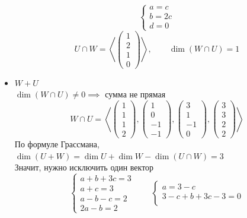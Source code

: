 \begin{itemize}
$$    \begin{cases}
    	a = c \\
        b = 2c \\
        d = 0
    \end{cases} $$
    $$ U \cap W = \left\langle
    \begin{pmatrix}
    	1 \\
        2 \\
        1 \\
        0
    \end{pmatrix} \right\rangle, \qquad \dim (W \cap U) = 1 $$
    \item $ W + U $ \\
    $ \dim (W \cap U) \ne 0 \implies $ сумма не прямая
    $$ W \cap U = \left\langle
    \begin{pmatrix}
    	1 \\
        1 \\
        1 \\
        2
    \end{pmatrix},
    \begin{pmatrix}
    	1 \\
        0 \\
        -1 \\
        -1
    \end{pmatrix},
    \begin{pmatrix}
    	3 \\
        1 \\
        -1 \\
        0
    \end{pmatrix},
    \begin{pmatrix}
    	3 \\
        3 \\
        2 \\
        2
    \end{pmatrix} \right\rangle $$
    По формуле Грассмана, $ \dim (U + W) = \dim U + \dim W - \dim (U \cap W) = 3 $ \\
    Значит, нужно исключить один вектор
    $$
    \begin{cases}
    	a + b + 3c = 3 \\
        a + c = 3 \\
        a - b - c = 2 \\
        2a - b = 2
    \end{cases} \qquad
    \begin{cases}
    	a = 3 - c \\
        3 - c + b + 3c - 3 = 0 \\

\end{cases}$$
\end{itemize}

